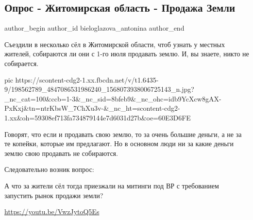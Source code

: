  
 
 
 
 
 
\subsection{Опрос - Житомирская область - Продажа Земли}
\label{sec:07_06_2021.fb.bieloglazova_antonina.1.zemlja_prodazha_opros_zhitomir_obl}
\ifcmt
 author_begin
   author_id bieloglazova_antonina
 author_end
\fi

Съездили в несколько сёл в Житомирской области, чтоб узнать у местных жителей,
собираются ли они с 1-го июля продавать землю. И, вы знаете, никто не
собирается. 

\ifcmt
  pic https://scontent-cdg2-1.xx.fbcdn.net/v/t1.6435-9/198562789_4847086531986240_1568073938006725143_n.jpg?_nc_cat=100&ccb=1-3&_nc_sid=8bfeb9&_nc_ohc=idb9YcXcw8gAX-PxKxj&tn=ntrKbsW_7ChXu3v-&_nc_ht=scontent-cdg2-1.xx&oh=59308ef713fa734879144e7d6031d27b&oe=60E3D6FE
\fi

Говорят, что если и продавать свою землю, то за очень большие деньги, а не за
те копейки, которые им предлагают. Но в основном люди ни за какие деньги землю
свою продавать не собираются. 

Следовательно возник вопрос: 

А что за жители сёл тогда приезжали на митинги под ВР с требованием запустить рынок продажи земли? 

\url{https://youtu.be/VwzJytoQ5Es}
